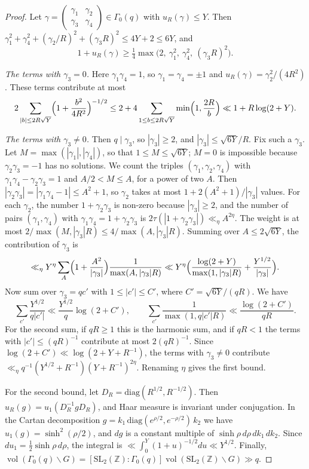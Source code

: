 \documentclass[11pt]{amsart}
\theoremstyle{remark}
\theoremstyle{definition}
\numberwithin{equation}{section}
\newcommand{\Z}{\mathbb{Z}}
\newcommand{\vol}{\operatorname{vol}}
\newcommand{\SL}{\mathrm{SL}}
\begin{document}
\begin{proof}
Let $\gamma=\left(\begin{smallmatrix}\gamma_1&\gamma_2\\ \gamma_3&\gamma_4\end{smallmatrix}\right)\in\Gamma_0(q)$ with $u_R(\gamma)\le Y$. Then $\gamma_1^2+\gamma_4^2+(\gamma_2/R)^2+(\gamma_3R)^2\le4Y+2\le6Y$, and
\[
1+u_R(\gamma)\ge\tfrac14\max\bigl(2,\ \gamma_1^2,\ \gamma_4^2,\ (\gamma_3R)^2\bigr).
\]

\emph{The terms with $\gamma_3=0$.} Here $\gamma_1\gamma_4=1$, so $\gamma_1=\gamma_4=\pm1$ and $u_R(\gamma)=\gamma_2^2/(4R^2)$. These terms contribute at most
\[
2\sum_{|b|\le2R\sqrt Y}\Bigl(1+\frac{b^2}{4R^2}\Bigr)^{-1/2}\le2+4\sum_{1\le b\le2R\sqrt Y}\min\Bigl(1,\frac{2R}b\Bigr)\ll1+R\log(2+Y).
\]

\emph{The terms with $\gamma_3\ne0$.} Then $q\mid\gamma_3$, so $|\gamma_3|\ge2$, and $|\gamma_3|\le\sqrt{6Y}/R$. Fix such a $\gamma_3$. Let $M=\max(|\gamma_1|,|\gamma_4|)$, so that $1\le M\le\sqrt{6Y}$; $M=0$ is impossible because $\gamma_2\gamma_3=-1$ has no solutions. We count the triples $(\gamma_1,\gamma_2,\gamma_4)$ with $\gamma_1\gamma_4-\gamma_2\gamma_3=1$ and $A/2<M\le A$, for a power of two $A$. Then $|\gamma_2\gamma_3|=|\gamma_1\gamma_4-1|\le A^2+1$, so $\gamma_2$ takes at most $1+2(A^2+1)/|\gamma_3|$ values. For each $\gamma_2$, the number $1+\gamma_2\gamma_3$ is non-zero because $|\gamma_3|\ge2$, and the number of pairs $(\gamma_1,\gamma_4)$ with $\gamma_1\gamma_4=1+\gamma_2\gamma_3$ is $2\tau(|1+\gamma_2\gamma_3|)\ll_\eta A^{2\eta}$. The weight is at most $2/\max(M,|\gamma_3|R)\le4/\max(A,|\gamma_3|R)$. Summing over $A\le2\sqrt{6Y}$, the contribution of $\gamma_3$ is
\[
\ll_\eta Y^{\eta}\sum_{A}\Bigl(1+\frac{A^2}{|\gamma_3|}\Bigr)\frac{1}{\max(A,|\gamma_3|R)}\ll Y^{\eta}\Bigl(\frac{\log(2+Y)}{\max(1,|\gamma_3|R)}+\frac{Y^{1/2}}{|\gamma_3|}\Bigr).
\]
Now sum over $\gamma_3=qc'$ with $1\le|c'|\le C'$, where $C'=\sqrt{6Y}/(qR)$. We have
\[
\sum_{c'}\frac{Y^{1/2}}{q|c'|}\ll\frac{Y^{1/2}}q\log(2+C'),\qquad\sum_{c'}\frac1{\max(1,q|c'|R)}\ll\frac{\log(2+C')}{qR}.
\]
For the second sum, if $qR\ge1$ this is the harmonic sum, and if $qR<1$ the terms with $|c'|\le(qR)^{-1}$ contribute at most $2(qR)^{-1}$. Since $\log(2+C')\ll\log(2+Y+R^{-1})$, the terms with $\gamma_3\ne0$ contribute $\ll_\eta q^{-1}(Y^{1/2}+R^{-1})(Y+R^{-1})^{2\eta}$. Renaming $\eta$ gives the first bound.

For the second bound, let $D_R=\mathrm{diag}(R^{1/2},R^{-1/2})$. Then $u_R(g)=u_1(D_R^{-1}gD_R)$, and Haar measure is invariant under conjugation. In the Cartan decomposition $g=k_1\,\mathrm{diag}(e^{\rho/2},e^{-\rho/2})\,k_2$ we have $u_1(g)=\sinh^2(\rho/2)$, and $dg$ is a constant multiple of $\sinh\rho\,d\rho\,dk_1\,dk_2$. Since $du_1=\frac12\sinh\rho\,d\rho$, the integral is $\ll\int_0^Y(1+u)^{-1/2}du\ll Y^{1/2}$. Finally, $\vol(\Gamma_0(q)\backslash G)=[\SL_2(\Z):\Gamma_0(q)]\vol(\SL_2(\Z)\backslash G)\gg q$.
\end{proof}
\end{document}
